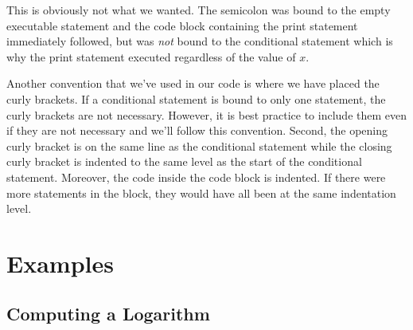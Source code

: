 This is obviously not what we wanted.  The semicolon was bound 
to the empty executable statement and the code block containing the
print statement immediately followed, but was \emph{not} bound to the
conditional statement which is why the print statement executed regardless
of the value of $x$.

Another convention that we've used in our code is where we have placed the
curly brackets.  If a conditional statement is bound to only one statement, 
the curly brackets are not necessary.  However, it is best practice to include them
even if they are not necessary and we'll follow this convention.  Second, the
opening curly bracket is on the same line as the conditional statement while
the closing curly bracket is indented to the same level as the start of the
conditional statement.  Moreover, the code inside the code block is indented.
If there were more statements in the block, they would have all been at the
same indentation level.

%
%
%
%

\section{Examples}

\subsection{Computing a Logarithm}

